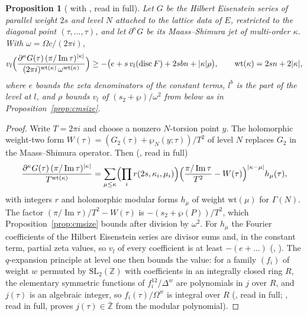 \documentclass[11pt]{article}
\newtheorem{proposition}[theorem]{Proposition}
\theoremstyle{remark}
\begin{document}
\begin{proposition}[ with , read in full]\label{prop:jet}
Let $G$ be the Hilbert Eisenstein series of parallel weight $2s$ and level $N$ attached to the lattice data of $E$, restricted to the diagonal point $(\tau,\dots,\tau)$, and let $\partial^{\kappa}G$ be its Maass--Shimura jet of multi-order $\kappa$. With $\omega=\Omega c/(2\pi i)$,
\[
v_l\Bigl(\frac{\partial^\kappa G(\tau)\,(\pi/\operatorname{Im}\tau)^{\lvert\kappa\rvert}}{(2\pi i)^{\mathrm{wt}(\kappa)}\,\omega^{\mathrm{wt}(\kappa)}}\Bigr)\ge-\bigl(e+s\,v_l(\operatorname{disc}F)+2sbn+\lvert\kappa\rvert\rho\bigr),\qquad\mathrm{wt}(\kappa)=2sn+2\lvert\kappa\rvert,
\]
where $e$ bounds the zeta denominators of the constant terms, $l^b$ is the part of the level at $l$, and $\rho$ bounds $v_l$ of $(s_2+\wp)/\omega^2$ from below as in Proposition~\ref{prop:cmsize}.
\end{proposition}

\begin{proof}
Write $T=2\pi i$ and choose a nonzero $N$-torsion point $y$. The holomorphic weight-two form $W(\tau)=(G_2(\tau)+\wp_N(y;\tau))/T^2$ of level $N$ replaces $G_2$ in the Maass--Shimura operator. Then (, read in full)
\[
\frac{\partial^\kappa G(\tau)\,(\pi/\operatorname{Im}\tau)^{\lvert\kappa\rvert}}{T^{\mathrm{wt}(\kappa)}}=\sum_{\mu\le\kappa}\Bigl(\prod_i r(2s,\kappa_i,\mu_i)\Bigr)\Bigl(\frac{\pi/\operatorname{Im}\tau}{T^2}-W(\tau)\Bigr)^{\lvert\kappa-\mu\rvert}h_\mu(\tau),
\]
with integers $r$ and holomorphic modular forms $h_\mu$ of weight $\mathrm{wt}(\mu)$ for $\Gamma(N)$. The factor $(\pi/\operatorname{Im}\tau)/T^2-W(\tau)$ is $-(s_2+\wp(P))/T^2$, which Proposition~\ref{prop:cmsize} bounds after division by $\omega^2$. For $h_\mu$ the Fourier coefficients of the Hilbert Eisenstein series are divisor sums and, in the constant term, partial zeta values, so $v_l$ of every coefficient is at least $-(e+\dots)$ (, ). The $q$-expansion principle at level one then bounds the value: for a family $(f_i)$ of weight $w$ permuted by $\mathrm{SL}_2(\mathbb Z)$ with coefficients in an integrally closed ring $R$, the elementary symmetric functions of $f_i^{12}/\Delta^w$ are polynomials in $j$ over $R$, and $j(\tau)$ is an algebraic integer, so $f_i(\tau)/\Omega^w$ is integral over $R$ (, read in full; , read in full, proves $j(\tau)\in\bar{\mathbb Z}$ from the modular polynomial).
\end{proof}
\end{document}
